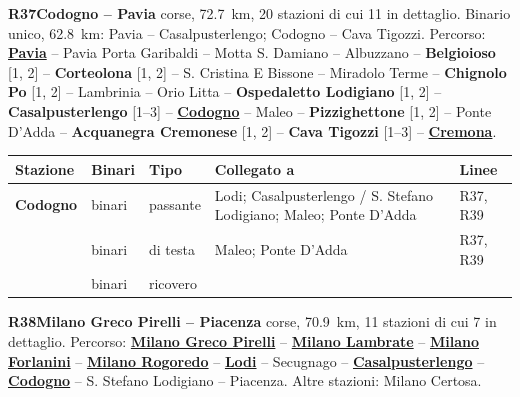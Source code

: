 \medskip\noindent\hypertarget{lin:R37}{\textbf{R37\enspace Codogno -- Pavia}} corse, \SI{72,7}{\km}, 20 stazioni di cui 11 in dettaglio. Binario unico, \SI{62,8}{\km}: Pavia -- Casalpusterlengo; Codogno -- Cava Tigozzi. Percorso: \hyperlink{sta:S01860}{\textbf{Pavia}} -- Pavia Porta Garibaldi -- Motta S. Damiano -- Albuzzano -- \hypertarget{sta:S01864}{\textbf{Belgioioso}} [1, 2] -- \hypertarget{sta:S01865}{\textbf{Corteolona}} [1, 2] -- S. Cristina E Bissone -- Miradolo Terme -- \hypertarget{sta:S01868}{\textbf{Chignolo Po}} [1, 2] -- Lambrinia -- Orio Litta -- \hypertarget{sta:S01871}{\textbf{Ospedaletto Lodigiano}} [1, 2] -- \hypertarget{sta:S01827}{\textbf{Casalpusterlengo}} [1--3] -- \hyperlink{sta:S01828}{\textbf{Codogno}} -- Maleo -- \hypertarget{sta:S01911}{\textbf{Pizzighettone}} [1, 2] -- Ponte D'Adda -- \hypertarget{sta:S01913}{\textbf{Acquanegra Cremonese}} [1, 2] -- \hypertarget{sta:S01914}{\textbf{Cava Tigozzi}} [1--3] -- \hyperlink{sta:S01915}{\textbf{Cremona}}.
{\footnotesize\setlength{\LTpre}{2pt}\setlength{\LTpost}{0pt}
\begin{longtable}{@{}>{\raggedright\arraybackslash}p{}>{\raggedright\arraybackslash}p{}>{\raggedright\arraybackslash}p{}>{\raggedright\arraybackslash}p{}>{\raggedright\arraybackslash}p{}@{}}
\toprule
Stazione & Binari & Tipo & Collegato a & Linee \\
\midrule
\endhead
\leavevmode\hypertarget{sta:S01828}{}\textbf{Codogno} & 4 binari & passante & Lodi; Casalpusterlengo / S. Stefano Lodigiano; Maleo; Ponte D'Adda & R37, R39 \\
 & 1 binari & di testa & Maleo; Ponte D'Adda & R37, R39 \\
 & 11 binari & ricovero & & \\
\bottomrule
\end{longtable}}

\medskip\noindent\hypertarget{lin:R38}{\textbf{R38\enspace Milano Greco Pirelli -- Piacenza}} corse, \SI{70,9}{\km}, 11 stazioni di cui 7 in dettaglio. Percorso: \hyperlink{sta:S01326}{\textbf{Milano Greco Pirelli}} -- \hyperlink{sta:S01701}{\textbf{Milano Lambrate}} -- \hyperlink{sta:S01492}{\textbf{Milano Forlanini}} -- \hyperlink{sta:S01820}{\textbf{Milano Rogoredo}} -- \hyperlink{sta:S01825}{\textbf{Lodi}} -- Secugnago -- \hyperlink{sta:S01827}{\textbf{Casalpusterlengo}} -- \hyperlink{sta:S01828}{\textbf{Codogno}} -- S. Stefano Lodigiano -- Piacenza. Altre stazioni: Milano Certosa.

